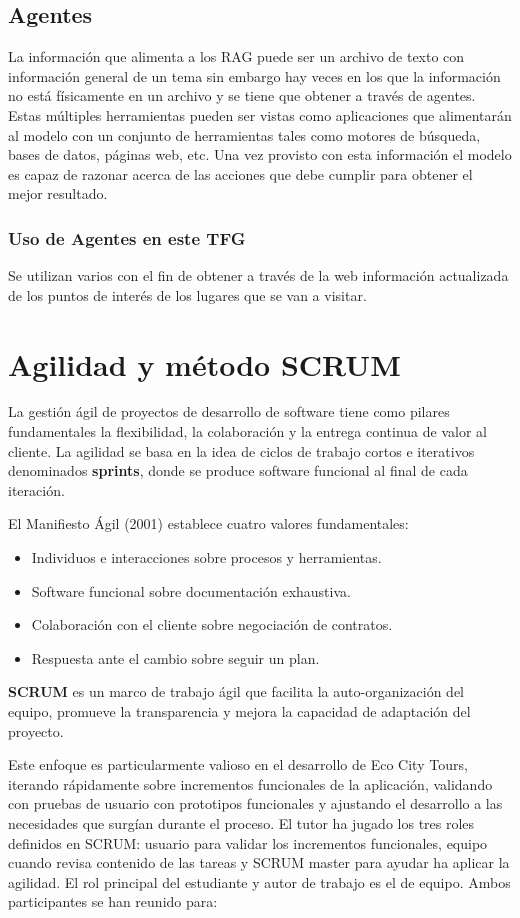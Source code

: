 \subsection{Agentes}
\label{sec:agentes}
La información que alimenta a los RAG puede ser un archivo de texto con información general de un tema sin embargo hay veces en los que la información no está físicamente en un archivo y se tiene que obtener a través de agentes.
Estas múltiples herramientas pueden ser vistas como aplicaciones que alimentarán al modelo con un conjunto de herramientas tales como motores de búsqueda, bases de datos, páginas web, etc. Una vez provisto con esta información el modelo es capaz de razonar acerca de las acciones que debe cumplir para obtener el mejor resultado.
\subsubsection{Uso de Agentes en este TFG}
Se utilizan varios con el fin de obtener a través de la web información actualizada de los puntos de interés de los lugares que se van a visitar.

\section{Agilidad y método SCRUM}
La gestión ágil de proyectos de desarrollo de software tiene como pilares fundamentales la flexibilidad, la colaboración y la entrega continua de valor al cliente\cite{agile_alliance}. La agilidad se basa en la idea de ciclos de trabajo cortos e iterativos denominados \textbf{sprints}, donde se produce software funcional al final de cada iteración.

El Manifiesto Ágil (2001) establece cuatro valores fundamentales:
\begin{itemize}
\item Individuos e interacciones sobre procesos y herramientas.
\item Software funcional sobre documentación exhaustiva.
\item Colaboración con el cliente sobre negociación de contratos.
\item Respuesta ante el cambio sobre seguir un plan.
\end{itemize}

\textbf{SCRUM} es un marco de trabajo ágil que facilita la auto-organización del equipo, promueve la transparencia y mejora la capacidad de adaptación del proyecto.

Este enfoque es particularmente valioso en el desarrollo de Eco City Tours, iterando rápidamente sobre incrementos funcionales de la aplicación, validando con pruebas de usuario con prototipos funcionales y ajustando el desarrollo a las necesidades que surgían durante el proceso. El tutor ha jugado los tres roles definidos en SCRUM: usuario para validar los incrementos funcionales, equipo cuando revisa contenido de las tareas y SCRUM master para ayudar ha aplicar la agilidad. El rol principal del estudiante y autor de trabajo es el de equipo. Ambos participantes se han reunido para:


